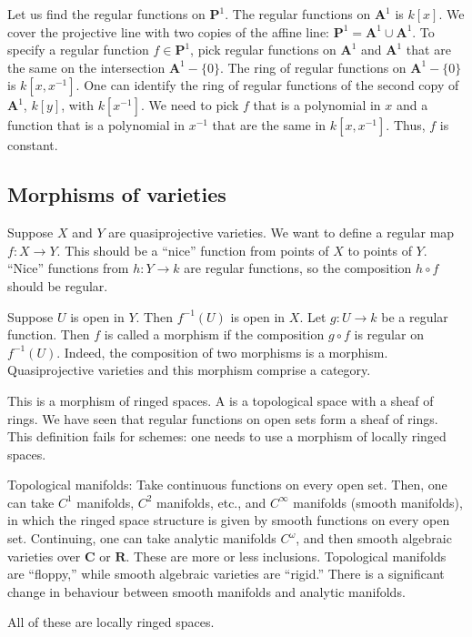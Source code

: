 \documentclass[11pt, oneside,margin=1in]{article}
\begin{document}
\begin{example}[ ]\label{}\text{}
Let us find the regular functions on $\mathbf{P}^1$. The regular functions on $\mathbf{A}^1$ is $k[x]$. We cover the projective line with two copies of the affine line: $\mathbf{P}^1 = \mathbf{A}^1\cup \mathbf{A}^1$. To specify a regular function $f\in \mathbf{P}^1$, pick regular functions on $\mathbf{A}^1$ and $\mathbf{A}^1$ that are the same on the intersection $\mathbf{A}^1-\{0\}$. The ring of regular functions on $\mathbf{A}^1-\{0\}$ is $k[x,x^{-1}]$. One can identify the ring of regular functions of the second copy of $\mathbf{A}^1$, $k[y]$, with $k[x^{-1}]$. We need to pick $f$ that is a polynomial in $x$ and a function that is a polynomial in $x^{-1}$ that are the same in $k[x,x^{-1}]$. Thus, $f$ is constant.
\end{example}

\subsection{Morphisms of varieties}
Suppose $X$ and $Y$ are quasiprojective varieties. We want to define a regular map $f:X\longrightarrow Y$. This should be a ``nice'' function from points of $X$ to points of $Y$. ``Nice'' functions from $h:Y\longrightarrow k$ are regular functions, so the composition $h\circ f$ should be regular.

Suppose $U$ is open in $Y$. Then $f^{-1}(U)$ is open in $X$. Let $g: U\longrightarrow k$ be a regular function. Then $f$ is called a morphism if the composition $g\circ f$ is regular on $f^{-1}(U)$. Indeed, the composition of two morphisms is a morphism. Quasiprojective varieties and this morphism comprise a category.

\begin{warn}
	This is a morphism of ringed spaces. A  is a topological space with a sheaf of rings. We have seen that regular functions on open sets form a sheaf of rings. This definition fails for schemes: one needs to use a morphism of locally ringed spaces.
\end{warn}

\begin{example}\label{}\text{}
	 Topological manifolds: Take continuous functions on every open set. Then, one can take $C^1$ manifolds, $C^2$ manifolds, etc., and $C^\infty$ manifolds (smooth manifolds), in which the ringed space structure is given by smooth functions on every open set. Continuing, one can take analytic manifolds $C^\omega$, and then smooth algebraic varieties over $\mathbf{C}$ or $\mathbf{R}$. These are more or less inclusions. Topological manifolds are ``floppy,'' while smooth algebraic varieties are ``rigid.'' There is a significant change in behaviour between smooth manifolds and analytic manifolds.  

	 All of these are locally ringed spaces.
\end{example}
\end{document}
